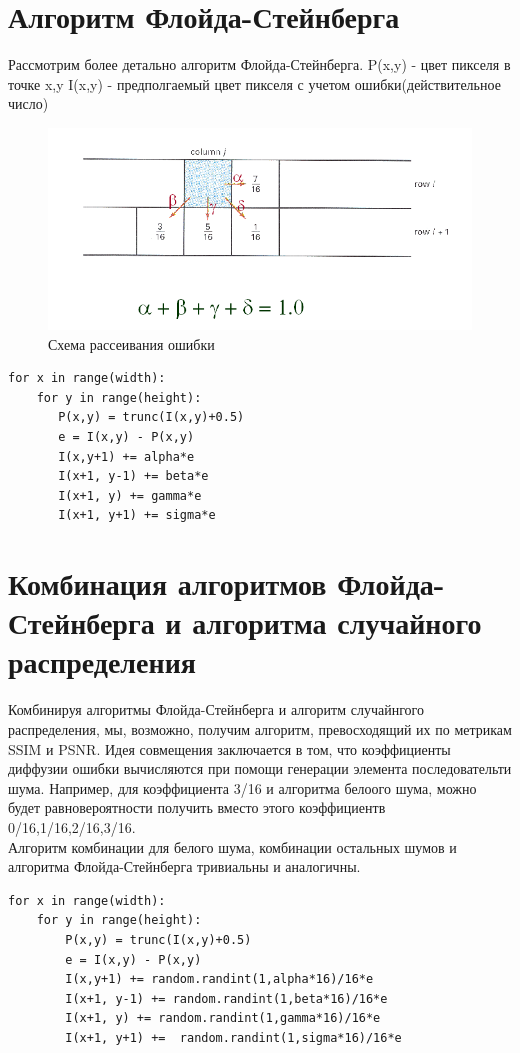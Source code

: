 \section{Алгоритм Флойда-Стейнберга}
Рассмотрим более детально алгоритм Флойда-Стейнберга.
P(x,y) - цвет пикселя в точке x,y
I(x,y) - предполгаемый цвет пикселя с учетом ошибки(действительное число)
\begin{figure}[h!]
	\centering
	\includegraphics[width=\textwidth]{img/1.png}
	\caption{Схема рассеивания ошибки}
	\label{fig:spire03}
\end{figure}
\begin{lstlisting}[style=pseudocode,caption={Алгоритм Флойда-Стейнберга}]
for x in range(width):
    for y in range(height):
       P(x,y) = trunc(I(x,y)+0.5)
       e = I(x,y) - P(x,y)
       I(x,y+1) += alpha*e
       I(x+1, y-1) += beta*e
       I(x+1, y) += gamma*e
       I(x+1, y+1) += sigma*e
\end{lstlisting}
\section{Комбинация алгоритмов Флойда-Стейнберга и алгоритма случайного распределения}
Комбинируя алгоритмы Флойда-Стейнберга и алгоритм случайнгого распределения, мы, возможно, получим алгоритм, превосходящий их по метрикам SSIM и PSNR.
Идея совмещения заключается в том, что коэффициенты диффузии ошибки вычисляются при помощи генерации элемента последовательти шума. Например, для коэффициента 3/16 и алгоритма белоого шума, можно будет равновероятности получить вместо этого коэффициентв 0/16,1/16,2/16,3/16.\\
Алгоритм комбинации для белого шума, комбинации остальных шумов и алгоритма Флойда-Стейнберга тривиальны и аналогичны. 
\begin{lstlisting}[style=pseudocode,caption={Алгоритм Флойда-Стейнберга и белый шум}]
for x in range(width):
    for y in range(height):
        P(x,y) = trunc(I(x,y)+0.5)
        e = I(x,y) - P(x,y)
        I(x,y+1) += random.randint(1,alpha*16)/16*e
        I(x+1, y-1) += random.randint(1,beta*16)/16*e
        I(x+1, y) += random.randint(1,gamma*16)/16*e
        I(x+1, y+1) +=  random.randint(1,sigma*16)/16*e
\end{lstlisting}




